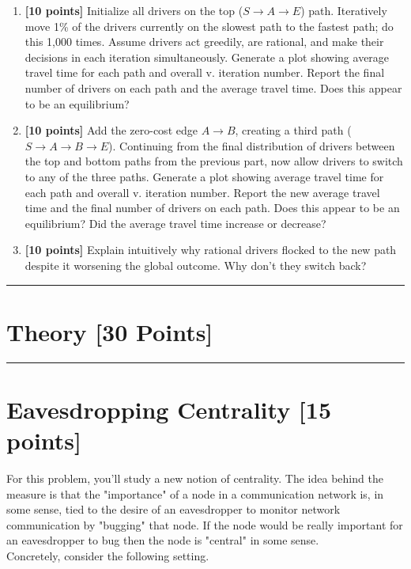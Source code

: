 \documentclass[11pt]{article}
\begin{document}
\begin{enumerate}[label=(\alph*)]
\item \textbf{[10 points]} Initialize all drivers on the top ($S \to A \to E$) path. Iteratively move 1\% of the drivers currently on the slowest path to the fastest path; do this 1,000 times. Assume drivers act greedily, are rational, and make their decisions in each iteration simultaneously. Generate a plot showing average travel time for each path and overall v. iteration number. Report the final number of drivers on each path and the average travel time. Does this appear to be an equilibrium?

\item \textbf{[10 points]} Add the zero-cost edge $A \to B$, creating a third path ($S \to A \to B \to E$). Continuing from the final distribution of drivers between the top and bottom paths from the previous part, now allow drivers to switch to any of the three paths. Generate a plot showing average travel time for each path and overall v. iteration number. Report the new average travel time and the final number of drivers on each path. Does this appear to be an equilibrium? Did the average travel time increase or decrease? 


\item \textbf{[10 points]} Explain intuitively why rational drivers flocked to the new path despite it worsening the global outcome. Why don't they switch back?
\end{enumerate}


\newpage
\noindent \rule{6in}{0.4pt}
\section*{Theory [30 Points]}
\rule{6in}{0.4pt}


\section{Eavesdropping Centrality [15 points]}

For this problem, you'll study a new notion of centrality. The idea behind the measure is that the "importance" of a node in a communication network is, in some sense, tied to the desire of an eavesdropper to monitor network communication by "bugging" that node. If the node would be really important for an eavesdropper to bug then the node is "central" in some sense.\\

\noindent Concretely, consider the following setting.
\end{document}
